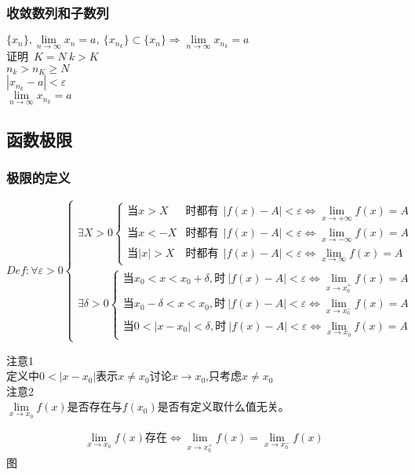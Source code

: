 \subsubsection{收敛数列和子数列
}
$\{x_n\},\lim\limits_{n\to\infty}x_n=a,\ \{x_{n_k}\}\subset\{x_n\}\Rightarrow \lim\limits_{n\to\infty}x_{n_k}=a$
\\证明\ $K=N\ k>K$\\
$n_k>n_K\geqslant N$\\
$\left|x_{n_k}-a\right|<\varepsilon$\\
$\lim\limits_{n\to\infty}x_{n_k}=a$

\subsection{函数极限}
\subsubsection{极限的定义}
$Def: \forall \varepsilon >0\begin{cases}
    \exists X>0\begin{cases}
        \mbox{当}x>X&\mbox{时都有}\ \ \left|f(x)-A\right|<\varepsilon \Leftrightarrow \lim\limits_{x\to +\infty}f(x)=A\\
        \mbox{当}x<-X&\mbox{时都有}\ \ \left|f(x)-A\right|<\varepsilon \Leftrightarrow \lim\limits_{x\to -\infty}f(x)=A\\
        \mbox{当}\left|x\right|>X&\mbox{时都有}\ \ \left|f(x)-A\right|<\varepsilon \Leftrightarrow \lim\limits_{x\to \infty}f(x)=A
    \end{cases}\\
    \exists\delta>0\begin{cases}
        \mbox{当}x_0<x<x_0+\delta,\mbox{时}\ \left|f(x)-A\right|<\varepsilon\Leftrightarrow\lim\limits_{x\to x_0^+}f(x)=A\\
        \mbox{当}x_0-\delta<x<x_0 ,\mbox{时}\ \left|f(x)-A\right|<\varepsilon\Leftrightarrow\lim\limits_{x\to x_0^-}f(x)=A\\
        \mbox{当}0<\left|x-x_0\right|<\delta,\mbox{时}\ \left|f(x)-A\right|<\varepsilon\Leftrightarrow\lim\limits_{x\to x_0}f(x)=A
    \end{cases}
\end{cases}$
\begin{center}
    注意1\\定义中$0<\left|x-x_0\right|$表示$x\neq x_0$讨论$x\rightarrow x_0$,只考虑$x\neq x_0$\\
    注意2\\$\lim\limits_{x\to x_0}f(x)$是否存在与$f(x_0)$是否有定义取什么值无关。\\
\end{center}
    \begin{align}
        \lim\limits_{x\to x_0}f(x)\mbox{存在}\Leftrightarrow \lim\limits_{x\to x_0^+}f(x)=\lim\limits_{x\to x_0^-}f(x)\label{limit_left_right}
    \end{align}
图
